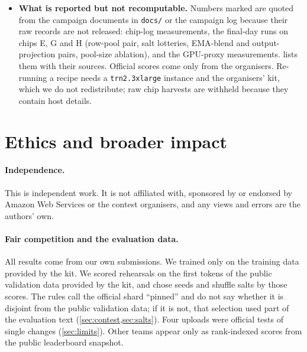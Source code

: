 \begin{itemize}
    \texttt{python paper/analysis/make\_all.py} regenerates \texttt{paper/numbers.tex}, every table in
    \texttt{paper/tables/} and every figure in \texttt{paper/figures/}; \texttt{python paper/check\_tex.py} runs the
    static checks; \texttt{latexmk -pdf main.tex} in \texttt{paper/} builds this document. The analysis is
    deterministic (fixed random seeds, no clock).
  \item \textbf{What is reported but not recomputable.} Numbers marked \docnum{} are quoted from the campaign
    documents in \texttt{docs/} or the campaign log because their raw records are not released: chip-log measurements, the final-day runs
    on chips E, G and H (row-pool pair, salt lotteries, EMA-blend and output-projection pairs, pool-size ablation),
    and the GPU-proxy measurements.  lists them with their sources. Official scores come only from
    the organisers. Re-running a recipe needs a \texttt{trn2.3xlarge} instance and the organisers' kit, which we do
    not redistribute; raw chip harvests are withheld because they contain host details.
\end{itemize}

\section*{Ethics and broader impact}

\paragraph{Independence.} This is independent work. It is not affiliated with, sponsored by or endorsed by Amazon
Web Services or the contest organisers, and any views and errors are the authors' own.

\paragraph{Fair competition and the evaluation data.} All results come from our own submissions. We trained only on
the training data provided by the kit. We scored rehearsals on the first  tokens of the public
validation data provided by the kit, and chose seeds and shuffle salts by those scores. The rules call the official
shard ``pinned'' and do not say whether it is disjoint from the public validation data; if it is not, that selection
used part of the evaluation text (\cref{sec:contest,sec:salts}). Four uploads were official tests of single changes
(\cref{sec:limits}). Other teams appear only as rank-indexed scores from the public leaderboard snapshot.

